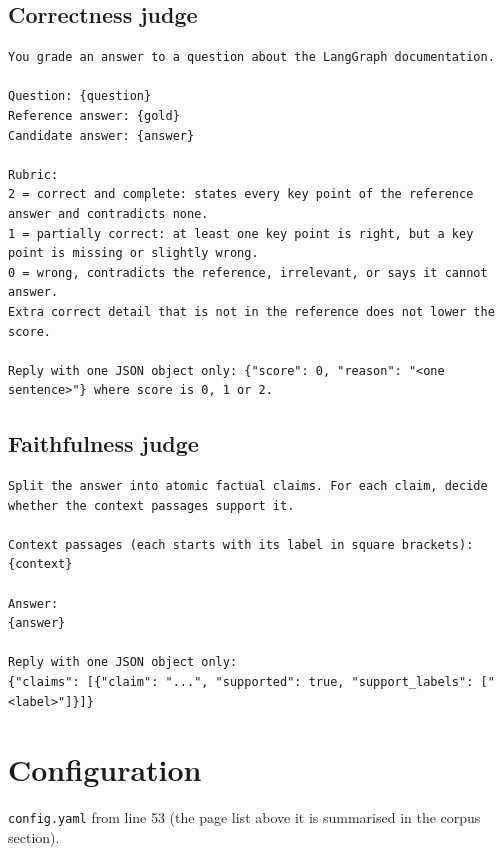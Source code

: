 \documentclass[11pt,a4paper]{article}
\newcommand{\code}[1]{\texttt{#1}}
\begin{document}
\subsection*{Correctness judge}
\begin{lstlisting}
You grade an answer to a question about the LangGraph documentation.

Question: {question}
Reference answer: {gold}
Candidate answer: {answer}

Rubric:
2 = correct and complete: states every key point of the reference answer and contradicts none.
1 = partially correct: at least one key point is right, but a key point is missing or slightly wrong.
0 = wrong, contradicts the reference, irrelevant, or says it cannot answer.
Extra correct detail that is not in the reference does not lower the score.

Reply with one JSON object only: {"score": 0, "reason": "<one sentence>"} where score is 0, 1 or 2.
\end{lstlisting}

\subsection*{Faithfulness judge}
\begin{lstlisting}
Split the answer into atomic factual claims. For each claim, decide whether the context passages support it.

Context passages (each starts with its label in square brackets):
{context}

Answer:
{answer}

Reply with one JSON object only:
{"claims": [{"claim": "...", "supported": true, "support_labels": ["<label>"]}]}
\end{lstlisting}

\section{Configuration}

\code{config.yaml} from line 53 (the page list above it is summarised in the corpus section).


\end{document}
